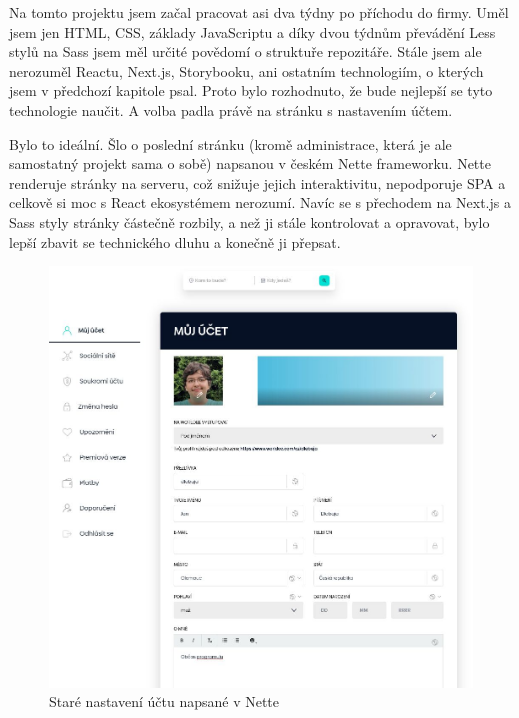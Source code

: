 Na tomto projektu jsem začal pracovat asi dva týdny po příchodu do firmy. Uměl jsem jen HTML, CSS, základy JavaScriptu a díky dvou týdnům převádění Less stylů na Sass jsem měl určité povědomí o struktuře repozitáře. Stále jsem ale nerozuměl Reactu, Next.js, Storybooku, ani ostatním technologiím, o kterých jsem v předchozí kapitole psal. Proto bylo rozhodnuto, že bude nejlepší se tyto technologie naučit. A volba padla právě na stránku s nastavením účtem.

Bylo to ideální. Šlo o poslední stránku (kromě administrace, která je ale samostatný projekt sama o sobě) napsanou v českém Nette frameworku. Nette renderuje stránky na serveru, což snižuje jejich interaktivitu, nepodporuje SPA a celkově si moc s React ekosystémem nerozumí\cite{NetteHowAppsWork}. Navíc se s přechodem na Next.js a Sass styly stránky částečně rozbily, a než ji stále kontrolovat a opravovat, bylo lepší zbavit se technického dluhu a konečně ji přepsat.

\begin{figure}[!h]
    \centering
    \includegraphics[width=0.7\linewidth]{obrazky/settings_old.png}
    \caption{Staré nastavení účtu napsané v Nette}
\end{figure}